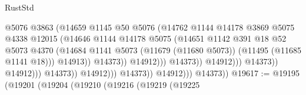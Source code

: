 \begin{lexlean}{RustStd}
\begin{coremodule}
                                                      @5076
                                                      @3863
                                                      (@14659
                                                        @1145
                                                        @50
                                                        @5076
                                                        (@14762
                                                          @1144
                                                          @14178
                                                          @3869
                                                          @5075
                                                          @4338
                                                          @12015
                                                          (@14646
                                                            @1144
                                                            @14178
                                                            @5075
                                                            (@14651
                                                              @1142
                                                              @391
                                                              @18
                                                              @52
                                                              @5073
                                                              @4370
                                                              (@14684
                                                                @1141
                                                                @5073
                                                                (@11679 (@11680 @5073))
                                                                (@11495 (@11685 @1141 @18)))
                                                              @14913))
                                                          @14373))
                                                      @14912)))
                                                @14373))
                                            @14912)))
                                      @14373))
                                  @14912)))
                            @14373))
                        @14912)))
                  @14373))
              @14912)))
        @14373))
@19617 := @19195
    (@19201
      (@19204
        (@19210
          (@19216
            (@19219
              (@19225

\end{coremodule}
\end{lexlean}

